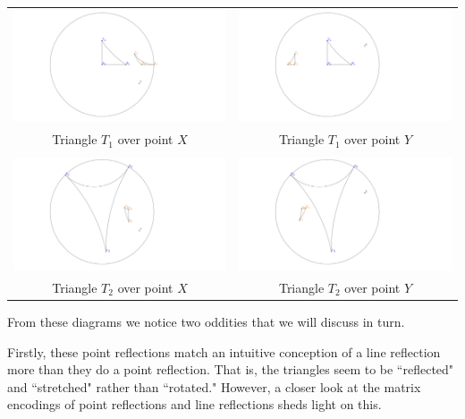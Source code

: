 \documentclass[12pt]{article}
\theoremstyle{plain}
\theoremstyle{definition}
\begin{document}
\begin{tabular}{cc}
 \includegraphics[width=65mm]{../images/triangle-1-point-reflection-2--1.png} & \includegraphics[width=65mm]{../images/triangle-1-point-reflection-2-1.png} \\
Triangle $T_1$ over point $X$ & Triangle $T_1$ over point $Y$  \\
& \\
\includegraphics[width=65mm]{../images/triangle-2-point-reflection-2--1.png} & \includegraphics[width=65mm]{../images/triangle-2-point-reflection-2-1.png}\\
Triangle $T_2$ over point $X$ & Triangle $T_2$ over point $Y$  \\
\end{tabular}

From these diagrams we notice two oddities that we will discuss in turn. 

Firstly, these point reflections match an intuitive conception of a line reflection more than they do a point reflection. That is, the triangles seem to be ``reflected" and ``stretched" rather than ``rotated." However, a closer look at the matrix encodings of point reflections and line reflections sheds light on this. 
\end{document}
